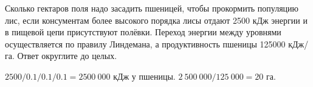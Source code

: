 
Сколько
гектаров поля надо засадить пшеницей, чтобы прокормить популяцию лис, если
консументам более высокого порядка лисы отдают 2500 кДж энергии и в пищевой
цепи присутствуют полёвки. Переход энергии между уровнями осуществляется по
правилу Линдемана, а продуктивность пшеницы 125000 кДж/га. Ответ округлите до
целых.

\solutionSection

$2500/0.1/0.1/0.1=2 500~000$ кДж у пшеницы. $2~500~000/125~000=20$ га.

